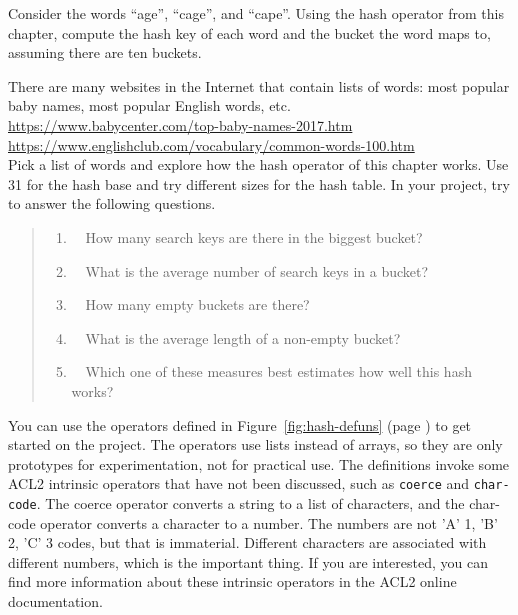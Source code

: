 \begin{ExerciseList}
\Exercise Consider the words ``age'', ``cage'', and ``cape''.
Using the hash operator from this chapter, compute the hash key of each word
and the bucket the word maps to, assuming there are ten buckets.


\Exercise There are many websites in the Internet that contain lists of words:
most popular baby names, most popular English words, etc.\\
\hspace*{1cm}\url{https://www.babycenter.com/top-baby-names-2017.htm} \\
\hspace*{1cm}\url{https://www.englishclub.com/vocabulary/common-words-100.htm}\\
Pick a list of words and explore how the hash operator of this chapter works.
Use 31 for the hash base and try different sizes for the hash table.
In your project, try to answer the following questions.
\begin{quote}
\begin{enumerate}
\item ~~How many search keys are there in the biggest bucket?
\item ~~What is the average number of search keys in a bucket?
\item ~~How many empty buckets are there?
\item ~~What is the average length of a non-empty bucket?
\item ~~Which one of these measures best estimates how well this hash works?
\end{enumerate}
\end{quote}
You can use the operators defined in 
Figure~\ref{fig:hash-defuns} (page \pageref{fig:hash-defuns})
to get started on the project. 
The operators use lists instead of arrays, so they are only  prototypes
for experimentation, not for practical use.
The definitions invoke some ACL2 intrinsic operators 
that have not been discussed, such as
\texttt{coerce} and \texttt{char-code}.
The coerce operator converts a string to a list of characters,
and the char-code operator converts a character to a number.
The numbers are not 'A' 1, 'B' 2, 'C' 3 codes, but that is immaterial.
Different characters are associated with different numbers, 
which is the important thing. If you are interested,
you can find more information about these intrinsic
operators in the ACL2 online documentation.
\end{ExerciseList}

